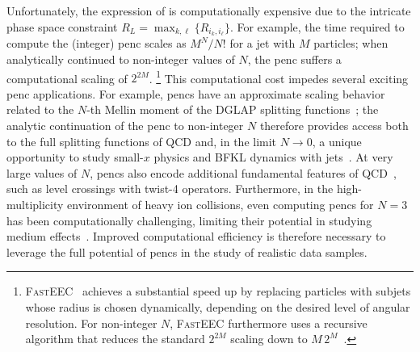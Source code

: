 Unfortunately, the expression of  is computationally expensive due to the intricate phase space constraint \(R_L = \max_{k,\ell}\{R_{i_k,i_\ell}\}\).
%
For example, the time required to compute the (integer) \gls{penc} scales as $M^N/N!$ for a jet with $M$ particles; when analytically continued to non-integer values of $N$, the \gls{penc} suffers  a computational scaling of $2^{2M}$.%
%
\footnote{
    \textsc{FastEEC}~\cite{Budhraja:2024xiq} achieves a substantial speed up by replacing particles with subjets whose radius is chosen dynamically, depending on the desired level of angular resolution.
    For non-integer $N$, \textsc{FastEEC} furthermore uses a recursive algorithm that reduces the standard $2^{2M}$ scaling down to $M\,2^M$~\cite{Budhraja:2024tev}.
}
%
This computational cost impedes several exciting \gls{penc} applications.
%
For example, \glspl{penc} have an approximate scaling behavior related to the $N$-th Mellin moment of the DGLAP splitting functions~\cite{Chen:2020vvp};
%
the analytic continuation of the \gls{penc} to non-integer $N$ therefore provides access both to the full splitting functions of QCD and, in the limit $N \to 0$, a unique opportunity to study small-$x$ physics and BFKL dynamics with jets~\cite{Chen:2020vvp,Neill:2020bwv,Budhraja:2024tev}.
%
At very large values of \(N\), \glspl{penc} also encode additional fundamental features of QCD~\cite{Chen:2020vvp,Dai:2024wff}, such as level crossings with twist-4 operators.
%
Furthermore, in the high-multiplicity environment of heavy ion collisions, even computing \glspl{penc} for \(N=3\) has been computationally challenging, limiting their potential in studying medium effects~\cite{Bossi:2024qho}.
%
Improved computational efficiency is therefore necessary to leverage the full potential of \glspl{penc} in the study of realistic data samples.


